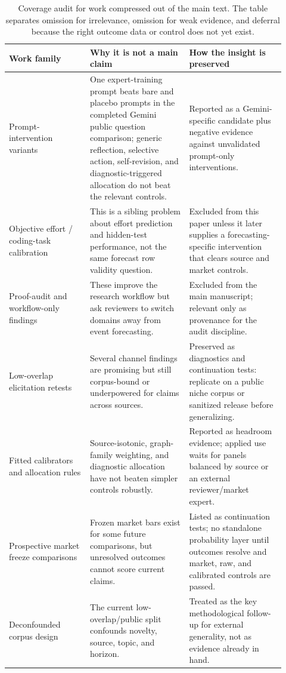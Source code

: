 \documentclass[11pt]{article}
\begin{document}
\begin{table}[htbp]
\centering
\small
\begin{tabular}{L{0.27\linewidth} L{0.33\linewidth} L{0.32\linewidth}}
\toprule
Work family & Why it is not a main claim & How the insight is preserved \\
\midrule
Prompt-intervention variants & One expert-training prompt beats bare and placebo prompts in the completed Gemini public question comparison; generic reflection, selective action, self-revision, and diagnostic-triggered allocation do not beat the relevant controls. & Reported as a Gemini-specific candidate plus negative evidence against unvalidated prompt-only interventions. \\
Objective effort / coding-task calibration & This is a sibling problem about effort prediction and hidden-test performance, not the same forecast row validity question. & Excluded from this paper unless it later supplies a forecasting-specific intervention that clears source and market controls. \\
Proof-audit and workflow-only findings & These improve the research workflow but ask reviewers to switch domains away from event forecasting. & Excluded from the main manuscript; relevant only as provenance for the audit discipline. \\
Low-overlap elicitation retests & Several channel findings are promising but still corpus-bound or underpowered for claims across sources. & Preserved as diagnostics and continuation tests: replicate on a public niche corpus or sanitized release before generalizing. \\
Fitted calibrators and allocation rules & Source-isotonic, graph-family weighting, and diagnostic allocation have not beaten simpler controls robustly. & Reported as headroom evidence; applied use waits for panels balanced by source or an external reviewer/market expert. \\
Prospective market freeze comparisons & Frozen market bars exist for some future comparisons, but unresolved outcomes cannot score current claims. & Listed as continuation tests; no standalone probability layer until outcomes resolve and market, raw, and calibrated controls are passed. \\
Deconfounded corpus design & The current low-overlap/public split confounds novelty, source, topic, and horizon. & Treated as the key methodological follow-up for external generality, not as evidence already in hand. \\
\bottomrule
\end{tabular}
\caption{Coverage audit for work compressed out of the main text. The table separates omission for irrelevance, omission for weak evidence, and deferral because the right outcome data or control does not yet exist.}
\label{tab:coverage-audit}
\end{table}
\end{document}
